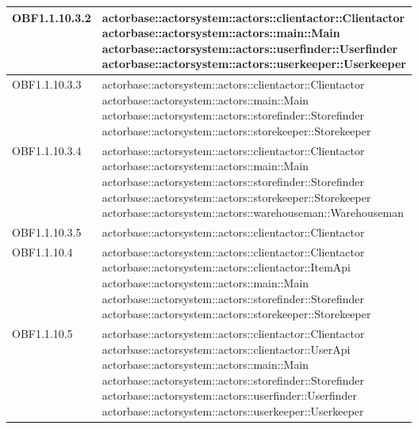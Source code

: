 \documentclass{scalatekids-article}
\begin{document}
\begin{longtable}[H]{|p{4.5cm}|p{13cm}|}
  \hline
  OBF1.1.10.3.2 & \multiLineCell[t]{actorbase::actorsystem::actors::clientactor::Clientactor\\actorbase::actorsystem::actors::main::Main\\actorbase::actorsystem::actors::userfinder::Userfinder\\actorbase::actorsystem::actors::userkeeper::Userkeeper\\}\\
  \hline
  OBF1.1.10.3.3 & \multiLineCell[t]{actorbase::actorsystem::actors::clientactor::Clientactor\\actorbase::actorsystem::actors::main::Main\\actorbase::actorsystem::actors::storefinder::Storefinder\\actorbase::actorsystem::actors::storekeeper::Storekeeper\\}\\
  \hline
  OBF1.1.10.3.4 & \multiLineCell[t]{actorbase::actorsystem::actors::clientactor::Clientactor\\actorbase::actorsystem::actors::main::Main\\actorbase::actorsystem::actors::storefinder::Storefinder\\actorbase::actorsystem::actors::storekeeper::Storekeeper\\actorbase::actorsystem::actors::warehouseman::Warehouseman\\}\\
  \hline
  OBF1.1.10.3.5 & \multiLineCell[t]{actorbase::actorsystem::actors::clientactor::Clientactor\\}\\
  \hline
  OBF1.1.10.4 & \multiLineCell[t]{actorbase::actorsystem::actors::clientactor::Clientactor\\actorbase::actorsystem::actors::clientactor::ItemApi\\actorbase::actorsystem::actors::main::Main\\actorbase::actorsystem::actors::storefinder::Storefinder\\actorbase::actorsystem::actors::storekeeper::Storekeeper\\}\\
  \hline
  OBF1.1.10.5 & \multiLineCell[t]{actorbase::actorsystem::actors::clientactor::Clientactor\\actorbase::actorsystem::actors::clientactor::UserApi\\actorbase::actorsystem::actors::main::Main\\actorbase::actorsystem::actors::storefinder::Storefinder\\actorbase::actorsystem::actors::userfinder::Userfinder\\actorbase::actorsystem::actors::userkeeper::Userkeeper\\}\\

\end{longtable}
\end{document}
